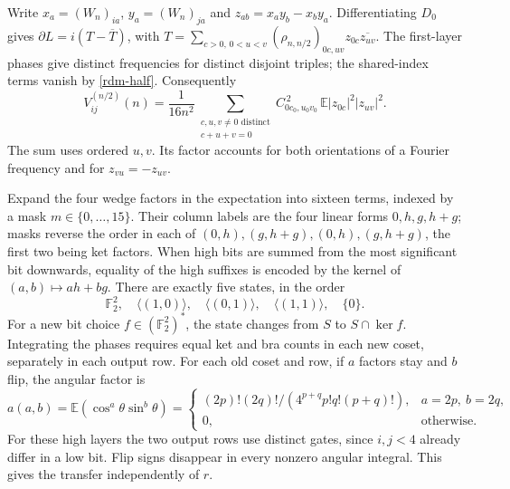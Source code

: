 \documentclass[11pt]{article}
\newcommand{\E}{\mathbb E}
\newcommand{\F}{\mathbb F_2}
\begin{document}
Write $x_a=(W_n)_{ia}$, $y_a=(W_n)_{ja}$ and $z_{ab}=x_ay_b-x_by_a$.
Differentiating $D_0$ gives $\partial L=i(T-\overline T)$, with
$T=\sum_{c>0,\,0<u<v}(\rho_{n,n/2})_{0c,uv}z_{0c}\overline{z_{uv}}$.
The first-layer phases give distinct frequencies for distinct disjoint triples;
the shared-index terms vanish by \eqref{rdm-half}. Consequently
\begin{equation}
 V^{(n/2)}_{ij}(n)=\frac1{16n^2}
 \sum_{\substack{c,u,v\ne0\text{ distinct}\\c+u+v=0}}
 C_{0c_0,u_0v_0}^{\,2}\,\E|z_{0c}|^2|z_{uv}|^2.\label{half-sum}
\end{equation}
The sum uses ordered $u,v$. Its factor accounts for both orientations of a
Fourier frequency and for $z_{vu}=-z_{uv}$.

Expand the four wedge factors in the expectation into sixteen terms, indexed
by a mask $m\in\{0,\ldots,15\}$. Their column labels are the four linear forms
$0,h,g,h+g$; masks reverse the order in each of
$(0,h),(g,h+g),(0,h),(g,h+g)$, the first two being ket factors.
When high bits are summed from the most significant bit downwards, equality of
the high suffixes is encoded by the kernel of $(a,b)\mapsto ah+bg$.
There are exactly five states, in the order
\[
 \F^2,\quad\langle(1,0)\rangle,\quad\langle(0,1)\rangle,
 \quad\langle(1,1)\rangle,\quad\{0\}.
\]
For a new bit choice $f\in(\F^2)^*$, the state changes from $S$ to
$S\cap\ker f$. Integrating the phases requires equal ket and bra counts in
each new coset, separately in each output row. For each old coset and row,
if $a$ factors stay and $b$ flip, the angular factor is
\begin{equation}
 a(a,b)=\E(\cos^a\theta\sin^b\theta)=
 \begin{cases}(2p)!(2q)!/(4^{p+q}p!q!(p+q)!),&a=2p,\ b=2q,\\0,&\text{otherwise}.
 \end{cases}\label{angular}
\end{equation}
For these high layers the two output rows use distinct gates, since $i,j<4$
already differ in a low bit. Flip signs disappear in every nonzero angular
integral. This gives the transfer independently of $r$.
\end{document}
